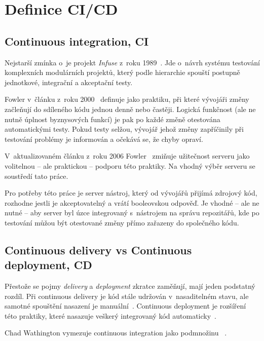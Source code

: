     \section*{Definice CI/CD}
        \label{sec:cicd}
        \subsection{Continuous integration, CI}
            Nejstarší zmínka o~\CI je projekt \textit{Infuse} z~roku 1989~\cite{kaiser-infuse}. Jde o~návrh systému testování komplexních modulárních projektů, který podle hierarchie spouští postupně jednotkové, integrační a akceptační testy.

            Fowler v~článku z~roku 2000~\cite{fowler-ci-original} definuje \CI jako praktiku, při které vývojáři změny začleňují do sdíleného kódu jednou denně nebo častěji. Logická funkčnost (ale ne nutně úplnost byznysových funkcí) je pak po každé změně otestována automatickými testy. Pokud testy selžou, vývojář jehož změny zapříčinily při testování problémy je informován a očekává se, že chyby opraví.

            V~aktualizovaném článku z~roku 2006 Fowler~\cite{fowler-ci} zmiňuje užitečnost \CI serveru jako volitelnou -- ale praktickou -- podporu této praktiky. Na vhodný výběr \CI serveru se soustředí tato práce.

            Pro potřeby této práce je \CI server nástroj, který od vývojářů přijímá zdrojový kód, rozhodne jestli je akceptovatelný a vrátí booleovskou odpověď. Je vhodné -- ale ne nutné -- aby \CI server byl úzce integrovaný s~nástrojem na správu repozitářů, kde po testování můžou být otestované změny přímo zařazeny do společného kódu.

        \subsection{Continuous delivery vs Continuous deployment, CD}
            Přestože se pojmy \textit{delivery} a \textit{deployment} zkratce \CD zaměňují, mají jeden podstatný rozdíl. Při continuous delivery je kód stále udržován v~nasaditelném stavu, ale samotné spouštění nasazení je manuální~\cite{cd-delivery}. Continuous deployment je rozšíření této praktiky, které nasazuje veškerý integrovaný kód automaticky~\cite{cd-versus}.

            Chad Wathington vymezuje continuous integration jako podmnožinu \CD~\cite{fowler-go}.

